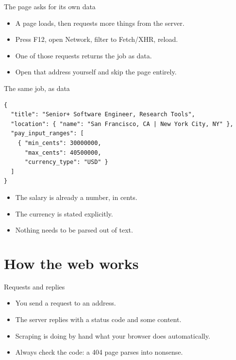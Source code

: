 \documentclass[11pt,aspectratio=169]{beamer}
\newenvironment{wideitemize}
  {\begin{itemize}\setlength{\itemsep}{10pt}}
  {\end{itemize}}
\begin{document}
\begin{frame}{The page asks for its own data}
\begin{wideitemize}
  \item A page loads, then requests more things from the server.
  \item Press F12, open Network, filter to Fetch/XHR, reload.
  \item One of those requests returns the job as data.
  \item Open that address yourself and skip the page entirely.
\end{wideitemize}
\end{frame}

\begin{frame}[fragile]{The same job, as data}
\begin{lstlisting}[style=code]
{
  "title": "Senior+ Software Engineer, Research Tools",
  "location": { "name": "San Francisco, CA | New York City, NY" },
  "pay_input_ranges": [
    { "min_cents": 30000000,
      "max_cents": 40500000,
      "currency_type": "USD" }
  ]
}
\end{lstlisting}

\begin{wideitemize}
  \item The salary is already a number, in cents.
  \item The currency is stated explicitly.
  \item Nothing needs to be parsed out of text.
\end{wideitemize}
\end{frame}

\section{How the web works}
\begin{frame}{Requests and replies}
\begin{wideitemize}
  \item You send a request to an address.
  \item The server replies with a status code and some content.
  \item Scraping is doing by hand what your browser does automatically.
  \item Always check the code: a 404 page parses into nonsense.
\end{wideitemize}
\end{frame}
\end{document}
